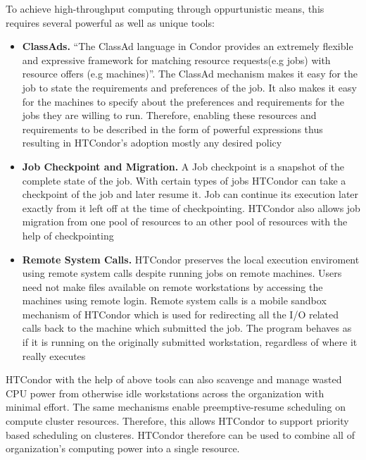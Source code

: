 \documentclass[9pt,twocolumn,twoside]{styles/osajnl}
\begin{document}
To achieve high-throughput computing through oppurtunistic means, this
requires several powerful as well as unique tools:

\begin{itemize}

\item {\bf ClassAds.} ``The ClassAd language in Condor provides an
  extremely flexible and expressive framework for matching resource
  requests(e.g jobs) with resource offers (e.g
  machines)''\cite{condor-practice}.  The ClassAd mechanism makes it
  easy for the job to state the requirements and preferences of the
  job. It also makes it easy for the machines to specify about the
  preferences and requirements for the jobs they are willing to run.
  Therefore, enabling these resources and requirements to be described
  in the form of powerful expressions thus resulting in HTCondor's
  adoption mostly any desired policy\cite{condor-practice}
  
\item {\bf Job Checkpoint and Migration.} A Job checkpoint is a
  snapshot of the complete state of the
  job\cite{Checkpoint_Migration_techreport_1997}. With certain types
  of jobs HTCondor can take a checkpoint of the job and later resume
  it. Job can continue its execution later exactly from it left off at
  the time of checkpointing. HTCondor also allows job migration from
  one pool of resources to an other pool of resources with the help of
  checkpointing\cite{beowulfbook-condor}

\item {\bf Remote System Calls.} HTCondor preserves the local
  execution enviroment using remote system calls despite running jobs
  on remote machines. Users need not make files available on remote
  workstations by accessing the machines using remote login. Remote
  system calls is a mobile sandbox mechanism of HTCondor which is used
  for redirecting all the I/O related calls back to the machine which
  submitted the job. The program behaves as if it is running on the
  originally submitted workstation, regardless of where it really
  executes\cite{condor-practice}
  
\end{itemize}

HTCondor with the help of above tools can also scavenge and manage
wasted CPU power from otherwise idle workstations across the
organization with minimal effort\cite{condor-hunter}. The same
mechanisms enable preemptive-resume scheduling on compute cluster
resources. Therefore, this allows HTCondor to support priority based
scheduling on clusteres. HTCondor therefore can be used to combine all
of organization's computing power into a single resource.
\end{document}
